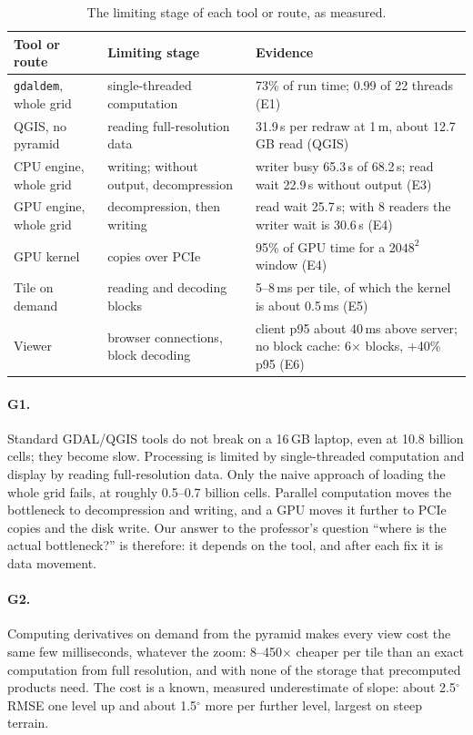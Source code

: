 \documentclass[11pt,a4paper]{article}
\begin{document}
\begin{table}[!htbp]
\centering\small
\caption{The limiting stage of each tool or route, as measured.}
\label{tab:bottleneck}
\begin{tabularx}{\linewidth}{>{\raggedright\arraybackslash}p{3.6cm}>{\raggedright\arraybackslash}p{4.4cm}L}
\toprule
Tool or route & Limiting stage & Evidence \\
\midrule
\texttt{gdaldem}, whole grid & single-threaded computation & 73\% of run time; 0.99 of 22 threads (E1) \\
QGIS, no pyramid & reading full-resolution data & 31.9\,s per redraw at 1\,m, about 12.7\,GB read (QGIS) \\
CPU engine, whole grid & writing; without output, decompression & writer busy 65.3\,s of 68.2\,s; read wait 22.9\,s
without output (E3) \\
GPU engine, whole grid & decompression, then writing & read wait 25.7\,s; with 8 readers the writer wait is 30.6\,s
(E4) \\
GPU kernel & copies over PCIe & 95\% of GPU time for a $2048^2$ window (E4) \\
Tile on demand & reading and decoding blocks & 5--8\,ms per tile, of which the kernel is about 0.5\,ms (E5) \\
Viewer & browser connections, block decoding & client p95 about 40\,ms above server; no block cache:
6$\times$ blocks, +40\% p95 (E6) \\
\bottomrule
\end{tabularx}
\end{table}

\paragraph{G1.} Standard GDAL/QGIS tools do not break on a 16\,GB laptop, even at 10.8 billion cells; they become
slow. Processing is limited by single-threaded computation and display by reading full-resolution data. Only the
naive approach of loading the whole grid fails, at roughly 0.5--0.7 billion cells. Parallel computation moves the
bottleneck to decompression and writing, and a GPU moves it further to PCIe copies and the disk write. Our
answer to the professor's question ``where is the actual bottleneck?'' is therefore: it depends on the tool, and
after each fix it is data movement.

\paragraph{G2.} Computing derivatives on demand from the pyramid makes every view cost the same few milliseconds,
whatever the zoom: 8--450$\times$ cheaper per tile than an exact computation from full resolution, and with none of
the storage that precomputed products need. The cost is a known, measured underestimate of slope: about 2.5$^\circ$
RMSE one level up and about 1.5$^\circ$ more per further level, largest on steep terrain.
\end{document}
